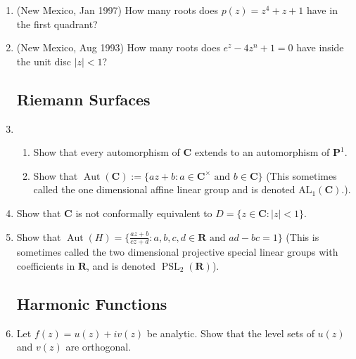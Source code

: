 \documentclass[a4paper,10pt]{article}
\title{}
\author{Dupuy --- Complex Analysis --- Spring 2017 --- Homework 06}
\date{}
\newcommand{\RR}{\mathbf{R}}
\newcommand{\CC}{\mathbf{C}}
\newcommand{\PSL}{\operatorname{PSL}}
\newcommand{\Aut}{\operatorname{Aut}}
\newcommand{\PP}{\mathbf{P}}
\begin{document}
\maketitle

\begin{enumerate}



\subsection*{}




\subsection*{Rouche's Theorem and Argument Principal}

\item (New Mexico, Jan 1997) How many roots does $p(z) = z^4 + z + 1$ have in the first quadrant?

\item (New Mexico, Aug 1993)
How many roots does $e^z - 4z^n +1 =0$ have inside the unit disc $\vert z \vert < 1$?


\subsection*{Riemann Surfaces}
\item 
\begin{enumerate}
 \item Show that every automorphism of $\CC$ extends to an automorphism of $\PP^1$.
 \item Show that $\Aut(\CC):= \lbrace az+b : a \in \CC^{\times} \mbox{ and } b\in \CC \rbrace$ (This sometimes called the one dimensional affine linear group and is denoted $\mathrm{AL}_1(\CC)$.).
\end{enumerate}

\item Show that $\CC$ is not conformally equivalent to $D = \lbrace z \in \CC: \vert z \vert < 1 \rbrace$. 

\item Show that $\Aut(H) = \lbrace \frac{az+b}{cz+d}: a,b,c,d\in \RR \mbox{ and } ad-bc =1 \rbrace$ (This is sometimes called the two dimensional projective special linear groups with coefficients in $\RR$, and is denoted $\PSL_2(\RR)$).


\subsection*{Harmonic Functions}
\item Let $f(z) = u(z) + i v(z)$ be analytic. 
Show that the level sets of $u(z)$ and $v(z)$ are orthogonal.


\end{enumerate}
\end{document}
